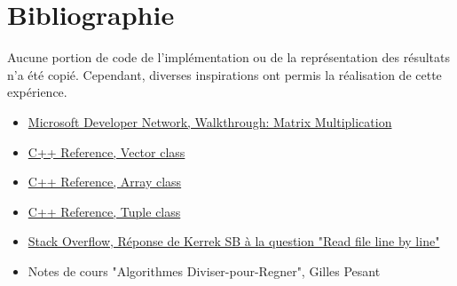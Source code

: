 \documentclass[10pt,a4paper]{article}
\begin{document}
\section{Bibliographie}

Aucune portion de code de l'implémentation ou de la représentation des résultats n'a été copié. Cependant, diverses inspirations ont permis la réalisation de cette expérience.

\begin{itemize}
	\item \href{http://msdn.microsoft.com/en-us/library/hh873134.aspx}{Microsoft Developer Network, Walkthrough: Matrix Multiplication}
	\item \href{http://www.cplusplus.com/reference/vector/vector/}{C++ Reference, Vector class}
	\item \href{http://www.cplusplus.com/doc/tutorial/arrays/}{C++ Reference, Array class}
	\item \href{http://www.cplusplus.com/reference/tuple/tuple/}{C++ Reference, Tuple class}
	\item \href{http://stackoverflow.com/questions/7868936/c-read-file-line-by-line}{Stack Overflow, Réponse de Kerrek SB à la question "Read file line by line"}
	\item Notes de cours "Algorithmes Diviser-pour-Regner", Gilles Pesant
\end{itemize}
\end{document}
